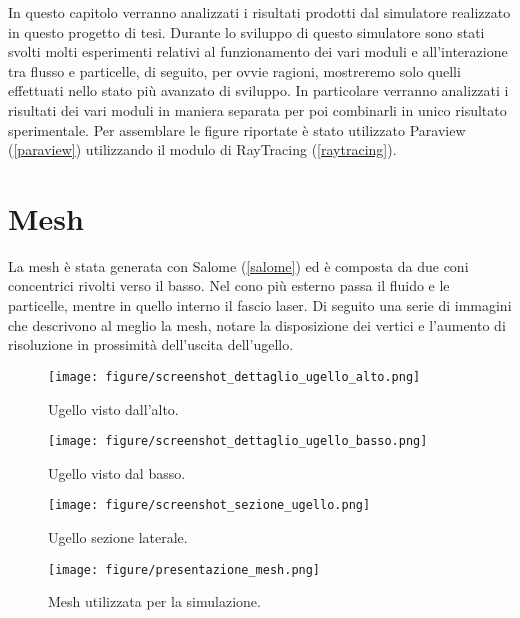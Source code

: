 In questo capitolo verranno analizzati i risultati prodotti dal simulatore realizzato in questo progetto di tesi.
Durante lo sviluppo di questo simulatore sono stati svolti molti esperimenti relativi al funzionamento dei vari moduli e all'interazione tra flusso e particelle, di seguito,
per ovvie ragioni, mostreremo solo quelli effettuati nello stato più avanzato di sviluppo.
In particolare verranno analizzati i risultati dei vari moduli in maniera separata per poi combinarli in unico risultato sperimentale.
Per assemblare le figure riportate è stato utilizzato Paraview (\ref{paraview}) utilizzando il modulo di RayTracing (\ref{raytracing}).

\section{Mesh}
La mesh è stata generata con Salome (\ref*{salome}) ed è composta da due coni concentrici rivolti verso il basso. Nel cono più esterno passa il fluido e le particelle,
mentre in quello interno il fascio laser. Di seguito una serie di immagini che descrivono al meglio la mesh, notare la disposizione dei vertici e l'aumento di risoluzione in prossimità
dell'uscita dell'ugello.
\begin{figure}[H]\label{dettaglio_ugello}
    \centering
    \texttt{[image: figure/screenshot\_dettaglio\_ugello\_alto.png]}
    \caption{Ugello visto dall'alto.}
\end{figure}
\begin{figure}[H]\label{dettaglio_ugello}
    \centering

    \texttt{[image: figure/screenshot\_dettaglio\_ugello\_basso.png]}
    \caption{Ugello visto dal basso.}
\end{figure}
\begin{figure}[H]\label{dettaglio_ugello}
    \centering
    \texttt{[image: figure/screenshot\_sezione\_ugello.png]}
    \caption{Ugello sezione laterale.}
\end{figure}

\begin{figure}[H]\label{dettaglio_ugello}
    \centering
    \texttt{[image: figure/presentazione\_mesh.png]}
    \caption{Mesh utilizzata per la simulazione.}
\end{figure}


